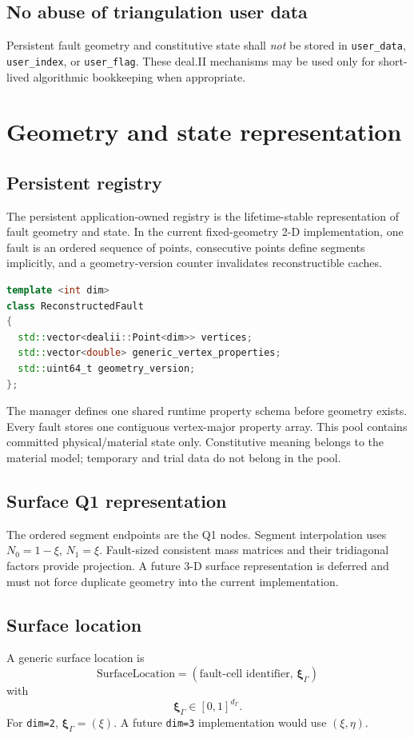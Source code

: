 \documentclass[11pt]{article}
\newcommand{\faultdim}{d_\Gamma}
\begin{document}
\subsection{No abuse of triangulation user data}
Persistent fault geometry and constitutive state shall \emph{not} be stored in
\texttt{user\_data}, \texttt{user\_index}, or \texttt{user\_flag}. These
deal.II mechanisms may be used only for short-lived algorithmic bookkeeping
when appropriate.

\section{Geometry and state representation}

\subsection{Persistent registry}
The persistent application-owned registry is the lifetime-stable
representation of fault geometry and state. In the current fixed-geometry 2-D
implementation, one fault is an ordered sequence of points, consecutive points
define segments implicitly, and a geometry-version counter invalidates
reconstructible caches.
\begin{lstlisting}[language=C++]
template <int dim>
class ReconstructedFault
{
  std::vector<dealii::Point<dim>> vertices;
  std::vector<double> generic_vertex_properties;
  std::uint64_t geometry_version;
};
\end{lstlisting}

The manager defines one shared runtime property schema before geometry exists.
Every fault stores one contiguous vertex-major property array. This pool
contains committed physical/material state only. Constitutive meaning belongs
to the material model; temporary and trial data do not belong in the pool.

\subsection{Surface Q1 representation}
The ordered segment endpoints are the Q1 nodes. Segment interpolation uses
\(N_0=1-\xi\), \(N_1=\xi\). Fault-sized consistent mass matrices and their
tridiagonal factors provide projection. A future 3-D surface representation is
deferred and must not force duplicate geometry into the current implementation.

\subsection{Surface location}
A generic surface location is
\[
\boxed{
\text{SurfaceLocation}
=
(\text{fault-cell identifier},\,\boldsymbol\xi_\Gamma)
}
\]
with
\[
\boldsymbol\xi_\Gamma\in[0,1]^{\faultdim}.
\]
For \texttt{dim=2}, $\boldsymbol\xi_\Gamma=(\xi)$.  A future \texttt{dim=3} implementation would use $(\xi,\eta)$.
\end{document}
